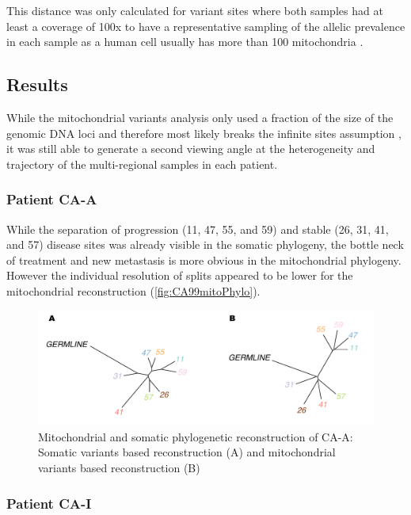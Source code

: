 This distance was only calculated for variant sites where both samples had at least a coverage of 100x to have a representative sampling of the allelic prevalence in each sample as a human cell usually has more than 100 mitochondria \cite{Cole2016}.


\subsection{Results}
\label{cascade-sec:mitoResults}
While the mitochondrial variants analysis only used a fraction of the size of the genomic DNA loci and therefore most likely breaks the infinite sites assumption \cite{Kimura1969}, it was still able to generate a second viewing angle at the heterogeneity and trajectory of the multi-regional samples in each patient.

\subsubsection{Patient CA-A}

While the separation of progression (11, 47, 55, and 59) and stable (26, 31, 41, and 57) disease sites was already visible in the somatic phylogeny, the bottle neck of treatment and new metastasis is more obvious in the mitochondrial phylogeny. However the individual resolution of splits appeared to be lower for the mitochondrial reconstruction (\autoref{fig:CA99mitoPhylo}).


\begin{figure}[h]
\centering
\includegraphics[width=.99\linewidth]{Figures/CASCADE/mito/CA99SomVsMitoPhylo.pdf}
\caption[Mitochondrial and somatic phylogenetic reconstruction of CA-A]{Mitochondrial and somatic phylogenetic reconstruction of CA-A: Somatic variants based reconstruction (A) and mitochondrial variants based reconstruction (B)} \label{fig:CA99mitoPhylo}
\end{figure}

\subsubsection{Patient CA-I}

